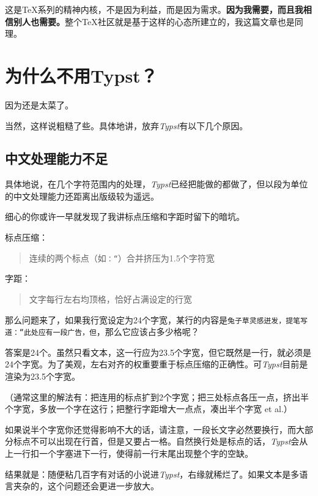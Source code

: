 \documentclass[10pt,openany]{book}
\begin{document}
\begin{sloppypar}
    这是{\TeX}系列的精神内核，不是因为利益，而是因为需求。\textbf{因为我需要，而且我相信别人也需要。}整个{\TeX}社区就是基于这样的心态所建立的，我这篇文章也是同理。

    \section{为什么不用Typst？}

    因为还是太菜了。

    当然，这样说粗糙了些。具体地讲，放弃\textit{Typst}有以下几个原因。

    \subsection{中文处理能力不足}

    具体地说，在几个字符范围内的处理，\textit{Typst}已经把能做的都做了，但以段为单位的中文处理能力还距离出版级较为遥远。

    细心的你或许一早就发现了我讲标点压缩和字距时留下的暗坑。

    标点压缩：

    \begin{quotation} 连续的两个标点（如\texttt{：“}）合并挤压为1.5个字符宽 \end{quotation}

    字距：

    \begin{quotation} 文字每行左右均顶格，恰好占满设定的行宽 \end{quotation}

    那么问题来了，如果我行宽设定为24个字宽，某行的内容是\texttt{兔子草灵感迸发，提笔写道：“此处应有一段广告，但}，那么它应该占多少格呢？

    答案是24个。虽然只看文本，这一行应为23.5个字宽，但它既然是一行，就必须是24个字宽。为了美观，左右对齐的权重要重于标点压缩的正确性。可\textit{Typst}目前是渲染为23.5个字宽。

    （通常这里的解法有：把连用的标点扩到2个字宽；把三处标点各压一点，挤出半个字宽，多放一个字在这行；把整行字距增大一点点，凑出半个字宽 et al.）

    如果说半个字宽你还觉得影响不大的话，请注意，一段长文字必然要换行，而大部分标点不可以出现在行首，但是又要占一格。自然换行处是标点的话，\textit{Typst}会从上一行扣一个字塞进下一行，使得前一行末尾出现整个字的空缺。

    结果就是：随便粘几百字有对话的小说进\textit{Typst}，右缘就稀烂了。如果文本是多语言夹杂的，这个问题还会更进一步放大。


\end{sloppypar}
\end{document}
